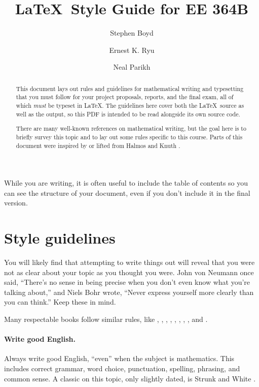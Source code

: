 \documentclass[12pt]{article}
\title{\LaTeX\ Style Guide for EE 364B}
\author{Stephen Boyd \and Ernest K. Ryu \and Neal Parikh}
\begin{document}
\maketitle

\begin{abstract}
This document lays out rules and guidelines for mathematical writing and
typesetting that you must follow for your project proposals, reports,
and the final exam, all of which \emph{must} be typeset in \LaTeX. The guidelines
here cover both the \LaTeX\ source as well as the output, so this PDF is
intended to be read alongside its own source code.

There are many well-known references on mathematical writing, but the
goal here is to briefly survey this topic and to lay out some rules specific to
this course. Parts of this document were inspired by or lifted from Halmos
\cite{Halmos:1970} and Knuth \cite{Knuth:1989}.
\end{abstract}

\newpage
\tableofcontents
\newpage

While you are writing, it is often useful to include 
the table of contents so you can see the structure of your document,
even if you don't include it in the final version.

\section{Style guidelines}

You will likely find that attempting to write things out will reveal that you
were not as clear about your topic as you thought you were. John von
Neumann once said, ``There's no sense in being precise when you don't even know
what you're talking about,'' and Niels Bohr wrote, ``Never express yourself more
clearly than you can think.'' Keep these in mind.

Many respectable books follow similar rules, like
\cite{BoV:04},
\cite[p.~23]{Cover:1991},
\cite[p.~26]{Hastie:2001},
\cite[p.~21]{Sipser:2001},
\cite[p.~25]{Cormen:2001},
\cite[p.~15]{Rudin:1976},
\cite[p.~18]{Evans:2010},
\cite[p.~3]{Goldstein:1980}, and 
\cite{Knuth:1973}.

\paragraph{Write good English.}
Always write good English, ``even'' when the subject is mathematics. This
includes correct grammar, word choice, punctuation, spelling, phrasing,
and common sense. 
A classic on this topic, only slightly dated, 
is Strunk and White \cite{SW:59}.
\end{document}
